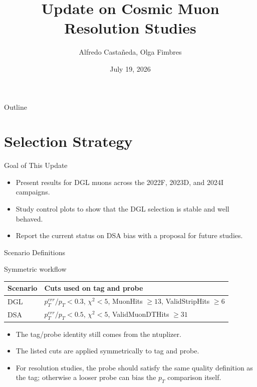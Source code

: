 \documentclass[aspectratio=169]{beamer}
\title{Update on Cosmic Muon Resolution Studies}
\subtitle{}
\author{Alfredo Casta\~neda, Olga Fimbres}
\date{July 19, 2026}
\makeatletter
\newcommand{\tightLooseTable}{
  \begin{tabular}{@{}ll@{}}
    \toprule
    Scenario & Cuts used on tag and probe \\
    \midrule
    DGL & $p_{T}^{err}/p_{T} < 0.3$, $\chi^{2} < 5$, MuonHits $\geq 13$, ValidStripHits $\geq 6$ \\
    DSA & $p_{T}^{err}/p_{T} < 0.5$, $\chi^{2} < 5$, ValidMuonDTHits $\geq 31$ \\
    \bottomrule
  \end{tabular}
}
\newcommand{\threebulletsummary}[3]{%
  \begin{itemize}
    \item #1
    \item #2
    \item #3
  \end{itemize}
}
\makeatother
\begin{document}
\begin{frame}
  \titlepage
\end{frame}

\begin{frame}{Outline}
  \tableofcontents
\end{frame}

\section{Selection Strategy}

\begin{frame}{Goal of This Update}
  \threebulletsummary
    {Present results for DGL muons across the 2022F, 2023D, and 2024I campaigns.}
    {Study control plots to show that the DGL selection is stable and well behaved.}
    {Report the current status on DSA bias with a proposal for future studies.}
\end{frame}

\begin{frame}{Scenario Definitions}
  \begin{block}{Symmetric workflow}
    \tightLooseTable
  \end{block}
  \vspace{0.5em}
  \begin{itemize}
    \item The tag/probe identity still comes from the ntuplizer.
    \item The listed cuts are applied symmetrically to tag and probe.
    \item For resolution studies, the probe should satisfy the same quality definition as the tag; otherwise a looser probe can bias the $p_{T}$ comparison itself.
  \end{itemize}
\end{frame}
\end{document}
